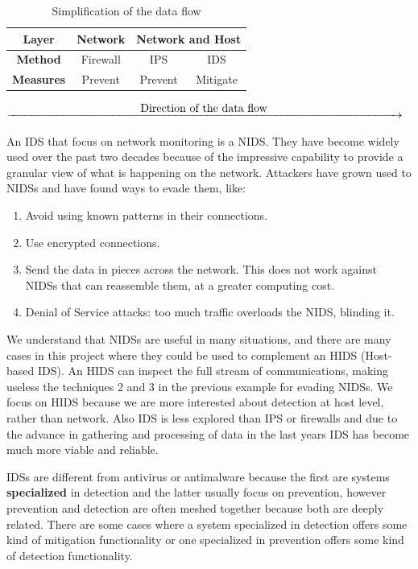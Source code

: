 \begin{table}[H]
	\centering
	\caption{Simplification of the data flow}
\linej
	\begin{tabular}{|c|c|c|c|}
	\hline
		\textbf{Layer} & \textbf{Network} & \multicolumn{2}{c|}{\textbf{Network and Host}}\\ \hline
		\textbf{Method} & Firewall & IPS & IDS\\ \hline
		\textbf{Measures} & Prevent & Prevent & Mitigate\\ \hline
	\end{tabular}
\end{table}
$\xrightarrow{\makebox[\textwidth]{Direction of the data flow}}$

\linej
\linej
An IDS that focus on network monitoring is a NIDS.
They have become widely used over the past two decades because of the impressive capability to provide a granular view of what is happening on the network.
\linej
Attackers have grown used to NIDSs and have found ways to evade them, like\cite{libro_ossec}:
\begin{enumerate}
	\item Avoid using known patterns in their connections.
	\item Use encrypted connections.
	\item Send the data in pieces across the network. This does not work against NIDSs that can reassemble them, at a greater computing cost. %
	\item Denial of Service attacks: too much traffic overloads the NIDS, blinding it.
\end{enumerate}
\linej
We understand that NIDSs are useful in many situations, and there are many cases in this project where they could be used to complement an HIDS (Host-based IDS).
An HIDS can inspect the full stream of communications, making useless the techniques 2 and 3 in the previous example for evading NIDSs.
\linej
We focus on HIDS because we are more interested about detection at host level, rather than network.
Also IDS is less explored than IPS or firewalls and due to the advance in gathering and processing of data in the last years IDS has become much more viable and reliable.

\linej
\linej
IDSs are different from antivirus or antimalware because the first are systems \textbf{specialized} in detection and the latter usually focus on prevention, however prevention and detection are often meshed together because both are deeply related. There are some cases where a system specialized in detection offers some kind of mitigation functionality or one specialized in prevention offers some kind of detection functionality.

